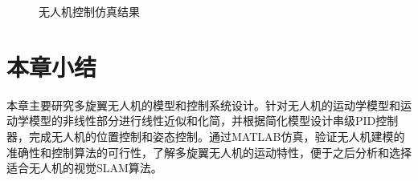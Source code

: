 \begin{figure}[h]
\centering
\caption{无人机控制仿真结果}
\label{fig2.5}
\end{figure}


\section{本章小结}
本章主要研究多旋翼无人机的模型和控制系统设计。针对无人机的运动学模型和运动学模型的非线性部分进行线性近似和化简，并根据简化模型设计串级PID控制器，完成无人机的位置控制和姿态控制。通过MATLAB仿真，验证无人机建模的准确性和控制算法的可行性，了解多旋翼无人机的运动特性，便于之后分析和选择适合无人机的视觉SLAM算法。

